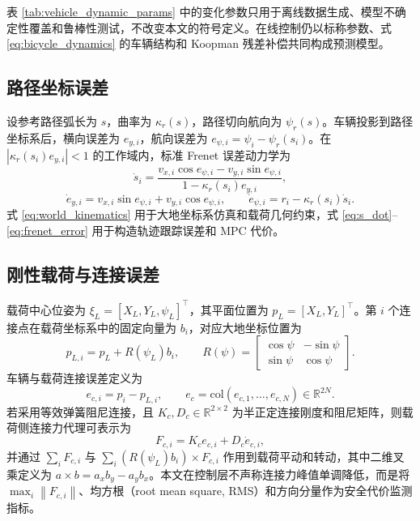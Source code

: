 \documentclass[twocolumn,3p,times,procedia]{elsarticle}
\newcommand{\R}{\mathbb{R}}
\newcommand{\norm}[1]{\left\lVert #1 \right\rVert}
\begin{document}
表 \ref{tab:vehicle_dynamic_params} 中的变化参数只用于离线数据生成、模型不确定性覆盖和鲁棒性测试，不改变本文的符号定义。在线控制仍以标称参数、式 \eqref{eq:bicycle_dynamics} 的车辆结构和 Koopman 残差补偿共同构成预测模型。

\subsection{路径坐标误差}

设参考路径弧长为 $s$，曲率为 $\kappa_r(s)$，路径切向航向为 $\psi_r(s)$。车辆投影到路径坐标系后，横向误差为 $e_{y,i}$，航向误差为 $e_{\psi,i}=\psi_i-\psi_r(s_i)$。在 $| \kappa_r(s_i)e_{y,i}|<1$ 的工作域内，标准 Frenet 误差动力学为
\begin{equation}
\dot s_i=\frac{v_{x,i}\cos e_{\psi,i}-v_{y,i}\sin e_{\psi,i}}
{1-\kappa_r(s_i)e_{y,i}},
\label{eq:s_dot}
\end{equation}
\begin{equation}
\dot e_{y,i}=v_{x,i}\sin e_{\psi,i}+v_{y,i}\cos e_{\psi,i},\qquad
\dot e_{\psi,i}=r_i-\kappa_r(s_i)\dot s_i .
\label{eq:frenet_error}
\end{equation}
式 \eqref{eq:world_kinematics} 用于大地坐标系仿真和载荷几何约束，式 \eqref{eq:s_dot}--\eqref{eq:frenet_error} 用于构造轨迹跟踪误差和 MPC 代价。

\subsection{刚性载荷与连接误差}

载荷中心位姿为 $\xi_L=[X_L,Y_L,\psi_L]^\top$，其平面位置为 $p_L=[X_L,Y_L]^\top$。第 $i$ 个连接点在载荷坐标系中的固定向量为 $b_i$，对应大地坐标位置为
\begin{equation}
p_{L,i}=p_L+R(\psi_L)b_i,\qquad
R(\psi)=\begin{bmatrix}\cos\psi&-\sin\psi\\ \sin\psi&\cos\psi\end{bmatrix}.
\label{eq:payload_anchor}
\end{equation}
车辆与载荷连接误差定义为
\begin{equation}
e_{c,i}=p_i-p_{L,i},\qquad
e_c=\mathrm{col}(e_{c,1},\ldots,e_{c,N})\in\R^{2N}.
\label{eq:connection_error}
\end{equation}
若采用等效弹簧阻尼连接，且 $K_c,D_c\in\R^{2\times2}$ 为半正定连接刚度和阻尼矩阵，则载荷侧连接力代理可表示为
\begin{equation}
F_{c,i}=K_c e_{c,i}+D_c\dot e_{c,i},
\label{eq:connection_force}
\end{equation}
并通过 $\sum_i F_{c,i}$ 与 $\sum_i (R(\psi_L)b_i)\times F_{c,i}$ 作用到载荷平动和转动，其中二维叉乘定义为 $a\times b=a_xb_y-a_yb_x$。本文在控制层不声称连接力峰值单调降低，而是将 $\max_i\norm{F_{c,i}}$、均方根（root mean square, RMS）和方向分量作为安全代价监测指标。
\end{document}
